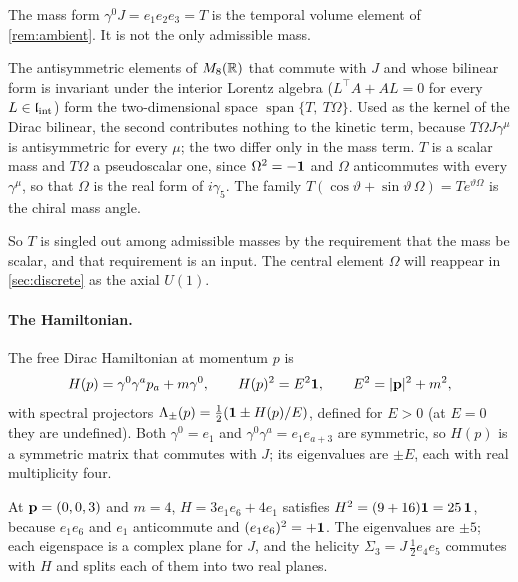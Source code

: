 The mass form $\gamma^0J=e_1e_2e_3=T$ is the temporal volume element of \cref{rem:ambient}. It is not the only admissible mass.

\begin{proposition}
\label{prop:massangle}
The antisymmetric elements of $M_8(\mathbb{R})$ that commute with $J$ and whose bilinear form is invariant under the interior Lorentz algebra ($L^{\!\top}A+AL=0$ for every $L\in\mathfrak l_{\rm int}$) form the
two-dimensional space $\operatorname{span}\{T,\ T\Omega\}$. Used as the kernel of the Dirac bilinear, the second contributes nothing
to the kinetic term, because $T\Omega J\gamma^\mu$ is antisymmetric for every $\mu$; the two differ only in the mass term. $T$ is a
scalar mass and $T\Omega$ a pseudoscalar one, since $\Omega^2=-\mathbf 1$ and $\Omega$ anticommutes with every $\gamma^\mu$, so that $\Omega$
is the real form of $i\gamma_5$. The family $T(\cos\vartheta+\sin\vartheta\,\Omega)=Te^{\vartheta\Omega}$ is the chiral mass angle.
\end{proposition}

So $T$ is singled out among admissible masses by the requirement that the mass be scalar, and that requirement is an input. The
central element $\Omega$ will reappear in \cref{sec:discrete} as the axial $U(1)$.

\paragraph{The Hamiltonian.} The free Dirac Hamiltonian at momentum $p$ is
\begin{equation}
\label{eq:Hp}
H(p)=\gamma^0\gamma^ap_a+m\gamma^0,\qquad H(p)^2=E^2\mathbf 1,\qquad E^2=|\mathbf p|^2+m^2 ,
\end{equation}
with spectral projectors $\Lambda_\pm(p)=\tfrac12(\mathbf 1\pm H(p)/E)$, defined for $E>0$ (at $E=0$ they are undefined). Both $\gamma^0=e_1$ and $\gamma^0\gamma^a=e_1e_{a+3}$ are symmetric, so
$H(p)$ is a symmetric matrix that commutes with $J$; its eigenvalues are $\pm E$, each with real multiplicity four.

\begin{example}
\label{ex:Hp}
At $\mathbf p=(0,0,3)$ and $m=4$, $H=3e_1e_6+4e_1$ satisfies $H^2=(9+16)\mathbf 1=25\,\mathbf 1$, because $e_1e_6$ and $e_1$ anticommute and
$(e_1e_6)^2=+\mathbf 1$. The eigenvalues are $\pm5$; each eigenspace is a complex plane for $J$, and the helicity
$\Sigma_3=J\,\tfrac12e_4e_5$ commutes with $H$ and splits each of them into two real planes.
\end{example}

